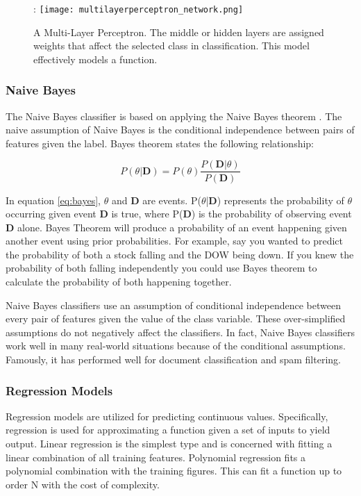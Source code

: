 \begin{figure}[htp]:
    \centering
    \texttt{[image: multilayerperceptron\_network.png]}
    \caption{A Multi-Layer Perceptron.
    The middle or hidden layers are assigned weights that affect the selected class in classification.
    This model effectively models a function.}
    \label{}
\end{figure}



\subsubsection{Naive Bayes}
The Naive Bayes classifier is based on applying the Naive Bayes theorem \cite{zhang2004optimality}.
The naive assumption of Naive Bayes is the conditional independence between pairs of features given the label.
Bayes theorem states the following relationship:

\begin{equation}
    \label{eq:bayes}
    P(\theta|\textbf{D}) = P(\theta) \frac{P(\textbf{D} |\theta)}{P(\textbf{D})}
\end{equation}

In equation \ref{eq:bayes}, $\theta$ and \textbf{D} are events. 
P($\theta$|\textbf{D}) represents the probability of $\theta$ occurring given event \textbf{D} is true, where P(\textbf{D}) is the probability of observing event \textbf{D} alone.
Bayes Theorem will produce a probability of an event happening given another event using prior probabilities.
For example, say you wanted to predict the probability of both a stock falling and the DOW being down.
If you knew the probability of both falling independently you could use Bayes theorem to calculate the probability of both happening together.

Naive Bayes classifiers use an assumption of conditional independence between every pair of features given the value of the class variable. 
These over-simplified assumptions do not negatively affect the classifiers.
In fact, Naive Bayes classifiers work well in many real-world situations because of the conditional assumptions\cite{zhang2004optimality}.
Famously, it has performed well for document classification and spam filtering. 

\subsubsection{Regression Models}
Regression models are utilized for predicting continuous values.
Specifically, regression is used for approximating a function given a set of inputs to yield output.
Linear regression is the simplest type and is concerned with fitting a linear combination of all training features.
Polynomial regression fits a polynomial combination with the training figures.
This can fit a function up to order N with the cost of complexity.

